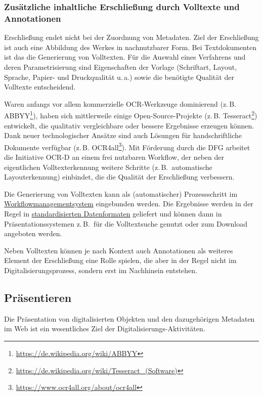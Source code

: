 \documentclass[
  11pt,
  letterpaper,
  DIV=11,
  twoside]{scrreprt}
\DeclareRobustCommand{\href}[2]{#2\footnote{\url{#1}}}
\begin{document}
\subsubsection{Zusätzliche inhaltliche Erschließung durch Volltexte und
Annotationen}\label{zusuxe4tzliche-inhaltliche-erschlieuxdfung-durch-volltexte-und-annotationen}

Erschließung endet nicht bei der Zuordnung von Metadaten. Ziel der
Erschließung ist auch eine Abbildung des Werkes in nachnutzbarer Form.
Bei Textdokumenten ist das die Generierung von Volltexten. Für die
Auswahl eines Verfahrens und deren Parametrisierung sind Eigenschaften
der Vorlage (Schriftart, Layout, Sprache, Papier- und Druckqualität
u.\,a.) sowie die benötigte Qualität der Volltexte entscheidend.

Waren anfangs vor allem kommerzielle OCR-Werkzeuge dominierend (z.\,B.
\href{https://de.wikipedia.org/wiki/ABBYY}{ABBYY}), haben sich
mittlerweile einige Open-Source-Projekte (z.\,B.
\href{https://de.wikipedia.org/wiki/Tesseract_(Software)}{Tesseract})
entwickelt, die qualitativ vergleichbare oder bessere Ergebnisse
erzeugen können. Dank neuer technologischer Ansätze sind auch Lösungen
für handschriftliche Dokumente verfügbar (z.\,B.
\href{https://www.ocr4all.org/about/ocr4all}{OCR4all}). Mit Förderung
durch die DFG arbeitet die Initiative OCR-D an einem frei nutzbaren
Workflow, der neben der eigentlichen Volltexterkennung weitere Schritte
(z.\,B.~automatische Layouterkennung) einbindet, die die Qualität der
Erschließung verbessern.

Die Generierung von Volltexten kann als (automatischer) Prozessschritt
im \hyperref[workflowmanagementsysteme]{Workflowmanagementsystem}
eingebunden werden. Die Ergebnisse werden in der Regel in
\hyperref[metadaten-und-schnittstellen]{standardisierten Datenformaten}
geliefert und können dann in Präsentationssystemen z.\,B.~für die
Volltextsuche genutzt oder zum Download angeboten werden.

Neben Volltexten können je nach Kontext auch Annotationen als weiteres
Element der Erschließung eine Rolle spielen, die aber in der Regel nicht
im Digitalisierungsprozess, sondern erst im Nachhinein entstehen.

\subsection{Präsentieren}\label{pruxe4sentieren}

Die Präsentation von digitalisierten Objekten und den dazugehörigen
Metadaten im Web ist ein wesentliches Ziel der
Digitalisierungs-Aktivitäten.
\end{document}

